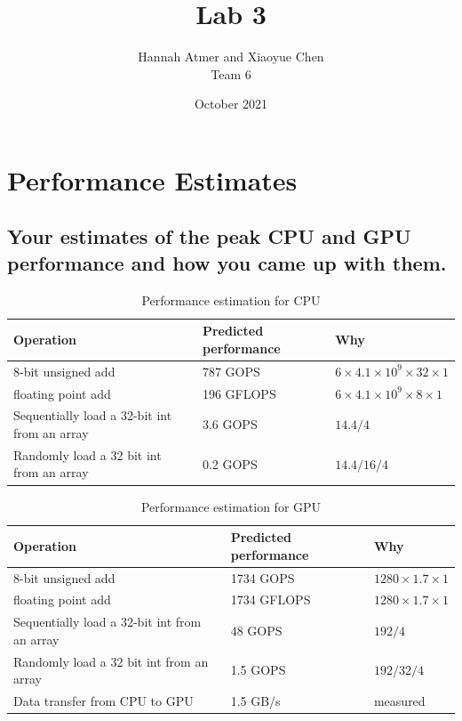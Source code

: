 \documentclass{article}
\title{Lab 3}
\author{Hannah Atmer and Xiaoyue Chen \\ Team 6}
\date{October 2021}
\begin{document}
\maketitle

\section{Performance Estimates}
\subsection{Your estimates of the peak CPU and GPU performance and how you came up with them. }

  \begin{table}[h]
    \centering
    \begin{tabular}{p{}p{}p{}}
      \toprule
      Operation & Predicted performance & Why \\
      \midrule
      8-bit unsigned add & 787 GOPS & \(6 \times 4.1\times10^{9} \times 32 \times 1\) \\
      floating point add & 196 GFLOPS & \(6 \times 4.1\times10^{9} \times 8 \times 1\) \\
      Sequentially load a 32-bit int from an array & 3.6 GOPS & \(14.4 / 4\) \\
      Randomly load a 32 bit int from an array & 0.2 GOPS & \(14.4 / 16 / 4\) \\
      \bottomrule
    \end{tabular}
    \caption{Performance estimation for CPU}
  \end{table}

  \begin{table}[h]
    \centering
    \begin{tabular}{p{}p{}p{}}
      \toprule
      Operation & Predicted performance & Why \\
      \midrule
      8-bit unsigned add & 1734 GOPS & \(1280 \times 1.7 \times 1\) \\
      floating point add & 1734 GFLOPS & \(1280 \times 1.7 \times 1\) \\
      Sequentially load a 32-bit int from an array & 48 GOPS & \(192 / 4\) \\
      Randomly load a 32 bit int from an array & 1.5 GOPS & \(192 / 32
                                                            / 4\) \\
      Data transfer from CPU to GPU & 1.5 GB/s & measured \\
      \bottomrule
    \end{tabular}
    \caption{Performance estimation for GPU}
  \end{table}
\end{document}
